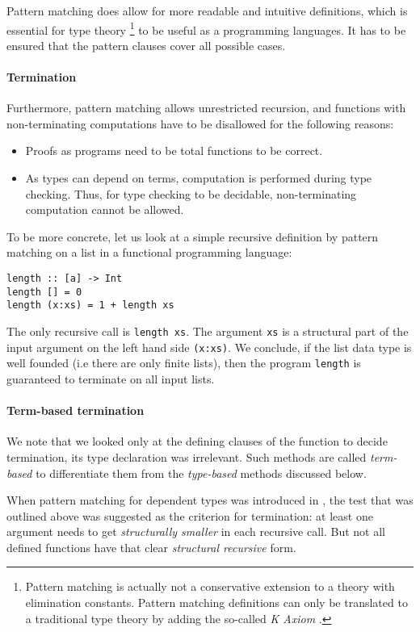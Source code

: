 Pattern matching does allow for more readable and intuitive definitions, which is essential for type theory \footnote{Pattern matching is actually not a conservative extension to a theory with elimination constants. 
Pattern matching definitions can only be translated to a traditional type theory by adding the so-called \emph{K Axiom} \cite{hofmann95groupoid,GoguHMcBrCM2006}. 
} to be useful as a programming languages. 
It has to be ensured that the pattern clauses cover all possible cases.
\paragraph*{Termination}
Furthermore, pattern matching allows unrestricted recursion, and functions with non-terminating computations have to be disallowed for the following reasons: 
\begin{itemize}
\item
Proofs as programs need to be total functions to be correct.
\item
As types can depend on terms, computation is performed during type checking.
Thus, for type checking to be decidable, non-terminating computation cannot be allowed. 
\end{itemize}
To be more concrete, let us look at a simple recursive definition by pattern matching on a list in a functional programming language: 
\begin{verbatim}
length :: [a] -> Int
length [] = 0
length (x:xs) = 1 + length xs 
\end{verbatim}
The only recursive call is \texttt{length xs}.
The argument \texttt{xs} is a structural part of the input argument on the left hand side \texttt{(x:xs)}.
We conclude, if the list data type is well founded (i.e there are only finite lists), then the program \texttt{length} is guaranteed to terminate on all input lists.

\paragraph*{Term-based termination}
We note that we looked only at the defining clauses of the function to decide termination, its type declaration was irrelevant. Such methods are called \emph{term-based} to differentiate them from the \emph{type-based} methods discussed below.

When pattern matching for dependent types was introduced in  \cite{coquand92pattern},
the test that was outlined above was suggested as the criterion for termination:
at least one argument needs to get \emph{structurally smaller} in each recursive call.
But not all defined functions have that clear \emph{structural recursive} form.

